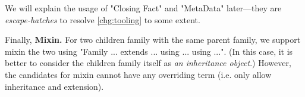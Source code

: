 
We will explain the usage of "Closing Fact" and "MetaData" later---they are \textit{escape-hatches} to resolve \ref{chg:tooling} to some extent.



Finally, \textbf{Mixin.} For two children family with the same parent family, we support mixin the two using "Family ... extends ... using ... using ...". (In this case, it is better to consider the children family itself as \textit{an inheritance object}.) However, the candidates for mixin cannot have any overriding term (i.e. only allow inheritance and extension).  